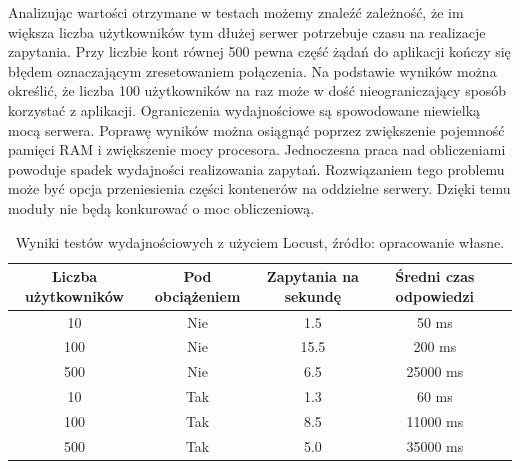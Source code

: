 Analizując wartości otrzymane w testach możemy znaleźć zależność, że im większa liczba użytkowników tym dłużej serwer potrzebuje czasu na realizacje zapytania. Przy liczbie kont równej 500 pewna część żądań do aplikacji kończy się błędem oznaczającym zresetowaniem połączenia. Na podstawie wyników można określić, że liczba 100 użytkowników na raz może w dość nieograniczający sposób korzystać z aplikacji. Ograniczenia wydajnościowe są spowodowane niewielką mocą serwera. Poprawę wyników można osiągnąć poprzez zwiększenie pojemność pamięci RAM i zwiększenie mocy procesora. Jednoczesna praca nad obliczeniami powoduje spadek wydajności realizowania zapytań. Rozwiązaniem tego problemu może być opcja przeniesienia części kontenerów na oddzielne serwery. Dzięki temu moduły nie będą konkurować o moc obliczeniową.  

\begin{table}[htb]
	\caption{Wyniki testów wydajnościowych z użyciem Locust, źródło: opracowanie własne.}
	\centering
	\begin{tabular}{|c|c|c|c|p{9cm}|}
		\hline
		\textbf{Liczba użytkowników}  & \textbf{Pod obciążeniem}  & \textbf{Zapytania na sekundę} & \textbf{Średni czas odpowiedzi} \\\hline
		10 & Nie & 1.5 & 50 ms \\\hline
		100 & Nie & 15.5 & 200 ms \\\hline
		500 & Nie & 6.5 & 25000 ms \\\hline
		10 & Tak & 1.3 & 60 ms \\\hline
		100 & Tak & 8.5 & 11000 ms \\\hline
		500 & Tak & 5.0 & 35000 ms \\\hline
	
		
	\end{tabular}
	\label{tabela_4_test_locust}
\end{table}

